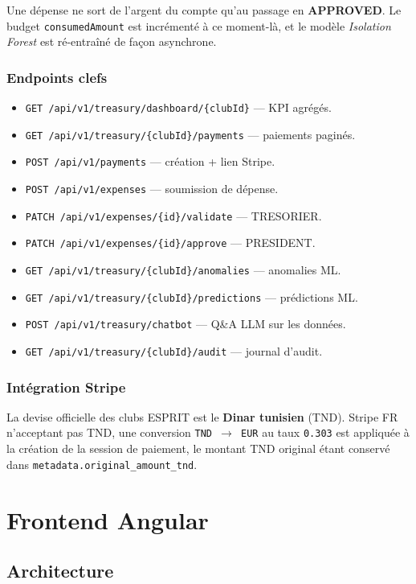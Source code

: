 \documentclass[11pt,a4paper]{report}
\begin{document}
Une dépense ne sort de l'argent du compte qu'au passage en \textbf{APPROVED}.
Le budget \texttt{consumedAmount} est incrémenté à ce moment-là, et le modèle
\textit{Isolation Forest} est ré-entraîné de façon asynchrone.

\subsection{Endpoints clefs}
\begin{itemize}
  \item \texttt{GET /api/v1/treasury/dashboard/\{clubId\}} — KPI agrégés.
  \item \texttt{GET /api/v1/treasury/\{clubId\}/payments} — paiements paginés.
  \item \texttt{POST /api/v1/payments} — création + lien Stripe.
  \item \texttt{POST /api/v1/expenses} — soumission de dépense.
  \item \texttt{PATCH /api/v1/expenses/\{id\}/validate} — TRESORIER.
  \item \texttt{PATCH /api/v1/expenses/\{id\}/approve} — PRESIDENT.
  \item \texttt{GET /api/v1/treasury/\{clubId\}/anomalies} — anomalies ML.
  \item \texttt{GET /api/v1/treasury/\{clubId\}/predictions} — prédictions ML.
  \item \texttt{POST /api/v1/treasury/chatbot} — Q\&A LLM sur les données.
  \item \texttt{GET /api/v1/treasury/\{clubId\}/audit} — journal d'audit.
\end{itemize}

\subsection{Intégration Stripe}
La devise officielle des clubs ESPRIT est le \textbf{Dinar tunisien} (TND).
Stripe FR n'acceptant pas TND, une conversion \texttt{TND \(\rightarrow\) EUR}
au taux \texttt{0.303} est appliquée à la création de la session de paiement,
le montant TND original étant conservé dans \texttt{metadata.original\_amount\_tnd}.


\chapter{Frontend Angular}

\section{Architecture}
\end{document}
